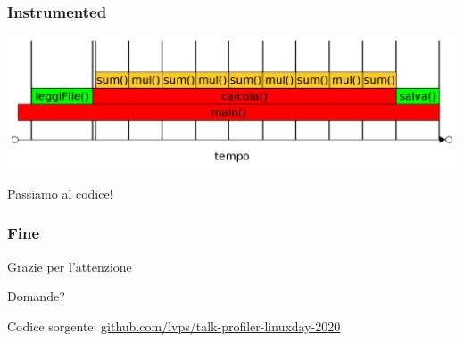 \documentclass[aspectratio=169]{beamer}
\begin{document}
\begin{frame}
\frametitle{Instrumented}
\centering
\includegraphics[width=\linewidth]{instrumented}
\end{frame}


\begin{frame}
	\Huge\centering Passiamo al codice!
\end{frame}

	\begin{frame}
		\frametitle{Fine}
		{\centering\Huge Grazie per l'attenzione\par}
		{\centering\large Domande?\par}
		
		\vspace{5em}
		Codice sorgente: \href{https://github.com/lvps/talk-profiler}{github.com/lvps/talk-profiler-linuxday-2020}
	\end{frame}
	
\end{document}
